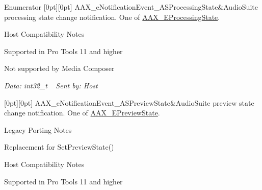 \begin{DoxyEnumFields}{Enumerator}
[0pt][0pt]{}\mbox{\label{a00491_afab5ea2cfd731fc8f163b6caa685406eaa55c7e25741c0d4f81cc49394e96a43c}} 
A\+A\+X\+\_\+e\+Notification\+Event\+\_\+\+A\+S\+Processing\+State&Audio\+Suite processing state change notification. One of \mbox{\hyperlink{a00491_a6ec854be40c8cf810dec97de3e56c0a7}{A\+A\+X\+\_\+\+E\+Processing\+State}}. \begin{DoxyRefDesc}{Host Compatibility Notes}
\item[\mbox{\hyperlink{a00786__compatibility_notes000033}{Host Compatibility Notes}}]Supported in Pro Tools 11 and higher 

Not supported by Media Composer\end{DoxyRefDesc}


{\itshape Data\+: {\ttfamily int32\+\_\+t}} ~\newline
 {\itshape Sent by\+: Host} \\
\hline

[0pt][0pt]{}\mbox{\label{a00491_afab5ea2cfd731fc8f163b6caa685406ea8ca3f7d5e93eecf945682f6fc55f5263}} 
A\+A\+X\+\_\+e\+Notification\+Event\+\_\+\+A\+S\+Preview\+State&Audio\+Suite preview state change notification. One of \mbox{\hyperlink{a00491_a12b280d7ccf22568759f8deb1fe1d6a8}{A\+A\+X\+\_\+\+E\+Preview\+State}}. \begin{DoxyRefDesc}{Legacy Porting Notes}
\item[\mbox{\hyperlink{a00787__porting_notes000021}{Legacy Porting Notes}}]Replacement for {\ttfamily Set\+Preview\+State()} \end{DoxyRefDesc}


\begin{DoxyRefDesc}{Host Compatibility Notes}
\item[\mbox{\hyperlink{a00786__compatibility_notes000034}{Host Compatibility Notes}}]Supported in Pro Tools 11 and higher 


\end{DoxyRefDesc}
\end{DoxyEnumFields}
